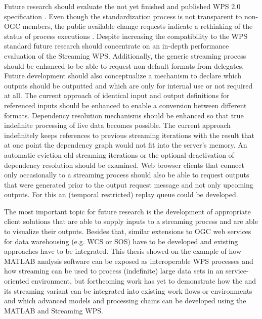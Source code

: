 Future research should evaluate the not yet finished and published WPS 2.0 specification \citep{ogc:wps2swg}. Even though the standardization process is not transparent to non-OGC members, the public available change requests indicate a rethinking of the status of process executions \citep[e.g. ][]{ogc:wps:cr109}. Despite increasing the compatibility to the WPS standard future research should concentrate on an in-depth performance evaluation of the Streaming WPS. Additionally, the generic streaming process should be enhanced to be able to request non-default formats from delegates. Future development should also conceptualize a mechanism to declare which outputs should be outputted and which are only for internal use or not required at all. The current approach of identical input and output definitions for referenced inputs should be enhanced to enable a conversion between different formats. Dependency resolution mechanisms should be enhanced so that true indefinite processing of live data becomes possible. The current approach indefinitely keeps references to previous streaming iterations with the result that at one point the dependency graph would not fit into the server's memory. An automatic eviction old streaming iterations or the optional deactivation of dependency resolution should be examined. Web browser clients that connect only occasionally to a streaming process should also be able to request outputs that were generated prior to the output request message and not only upcoming outputs. For this an (temporal restricted) replay queue could be developed.

The most important topic for future research is the development of appropriate client solutions that are able to supply inputs to a streaming process and are able to visualize their outputs. Besides that, similar extensions to OGC web services for data warehousing (e.g. \ac{WCS} or \ac{SOS}) have to be developed and existing approaches \citep[e.g. for the \ac{WFS}, see ][]{aydin2006streaming} have to be integrated. This thesis showed on the example of \la how MATLAB analysis software can be exposed as interoperable WPS processes and how streaming can be used to process (indefinite) large data sets in an service-oriented environment, but forthcoming work has yet to demonstrate how the \la and its streaming variant can be integrated into existing work flows or environments and which advanced models and processing chains can be developed using the MATLAB and Streaming WPS.
